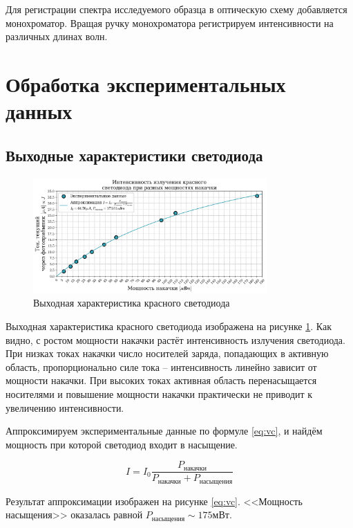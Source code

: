 \documentclass[a4paper, 12pt]{extarticle}
\begin{document}
Для регистрации спектра исследуемого образца в оптическую схему добавляется монохроматор. Вращая ручку монохроматора регистрируем интенсивности на различных длинах волн.

\section*{\textcolor{header}{Обработка экспериментальных данных}}

\subsection*{\textcolor{sub_header}{Выходные характеристики светодиода}}

\begin{figure}[htbp]
    \centering
    \includegraphics[width = 0.8\textwidth]{red_vc.png}
    \caption{Выходная характеристика красного светодиода}
    \label{fig:red_vc}
\end{figure}

Выходная характеристика красного светодиода изображена на рисунке \ref{fig:red_vc}. 
Как видно, с ростом мощности накачки растёт интенсивность излучения светодиода. При низках токах накачки число носителей заряда, попадающих в активную область, пропорционально силе тока --  интенсивность линейно зависит от мощности накачки. При высоких токах активная область перенасыщается носителями и повышение мощности накачки практически не приводит к увеличению интенсивности.


Аппроксимируем экспериментальные данные по формуле \ref{eq:vc}, и найдём мощность при которой светодиод входит в насыщение.

\begin{equation}
    I = I_0 \frac{P_{\text{накачки}}}{P_{\text{накачки}} + P_{\text{насыщения}}}
    \label{eq:vc}
\end{equation}

Результат аппроксимации изображен на рисунке  \ref{eq:vc}. <<Мощность насыщения>> оказалась равной $P_{\text{насыщения}} \sim 175 \text{мВт}$.
\end{document}
